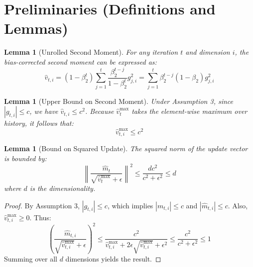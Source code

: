 \documentclass{article}
\newtheorem{lemma}[theorem]{Lemma}
\begin{document}
\newpage
\section*{Preliminaries (Definitions and Lemmas)}

\begin{lemma}[Unrolled Second Moment]
For any iteration $t$ and dimension $i$, the bias-corrected second moment can be expressed as:
$$ \hat{v}_{t,i} = (1-\beta_2^t) \sum_{j=1}^t \frac{\beta_2^{t-j}}{1-\beta_2^t} g_{j,i}^2 = \sum_{j=1}^t \beta_2^{t-j}(1-\beta_2) g_{j,i}^2 $$
\end{lemma}

\begin{lemma}[Upper Bound on Second Moment]
Under Assumption 3, since $|g_{t,i}| \leq c$, we have $\hat{v}_{t,i} \leq c^2$. Because $\hat{v}_t^{\max}$ takes the element-wise maximum over history, it follows that:
$$ \hat{v}_{t,i}^{\max} \leq c^2 $$
\end{lemma}

\begin{lemma}[Bound on Squared Update]
The squared norm of the update vector is bounded by:
$$ \left\| \frac{\hat{m}_t}{\sqrt{\hat{v}_t^{\max}} + \epsilon} \right\|^2 \leq \frac{d c^2}{c^2 + \epsilon^2} \leq d $$
where $d$ is the dimensionality.
\end{lemma}
\begin{proof}
By Assumption 3, $|g_{t,i}| \leq c$, which implies $|m_{t,i}| \leq c$ and $|\hat{m}_{t,i}| \leq c$. Also, $\hat{v}_{t,i}^{\max} \geq 0$. Thus:
$$ \left( \frac{\hat{m}_{t,i}}{\sqrt{\hat{v}_{t,i}^{\max}} + \epsilon} \right)^2 \leq \frac{c^2}{\hat{v}_{t,i}^{\max} + 2\epsilon\sqrt{\hat{v}_{t,i}^{\max}} + \epsilon^2} \leq \frac{c^2}{c^2 + \epsilon^2} \leq 1 $$
Summing over all $d$ dimensions yields the result.
\end{proof}
\end{document}
